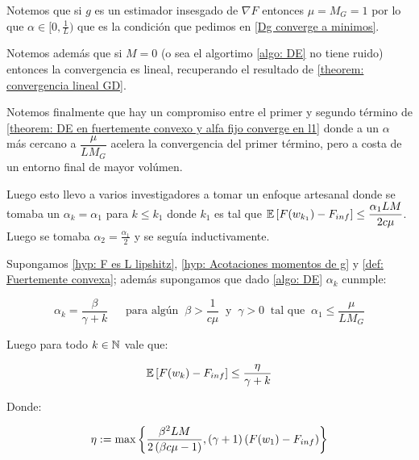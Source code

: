 \begin{remark}
	Notemos que si $g$ es un estimador insesgado de $\nabla F$ entonces $\mu = M_G = 1$ por lo que $\alpha \in [0, \frac{1}{L})$ que es la condici\'on que pedimos en \ref{Dg converge a minimos}.
\end{remark}

\begin{remark}
	Notemos adem\'as que si $M=0$ (o sea el algortimo \ref{algo: DE} no tiene ruido) entonces la convergencia es lineal, recuperando el resultado de \ref{theorem: convergencia lineal GD}.
\end{remark}

\begin{remark}
	Notemos finalmente que hay un compromiso entre el primer y segundo t\'ermino de \ref{theorem: DE en fuertemente convexo y alfa fijo converge en l1} donde a un $\alpha$ m\'as cercano a $\dfrac{\mu}{LM_G}$ acelera la convergencia del primer t\'ermino, pero a costa de un entorno final de mayor vol\'umen. 
	
	Luego esto llevo a varios investigadores a tomar un enfoque artesanal donde se tomaba un $\alpha_k = \alpha_1$ para $k \leq k_1$ donde $k_1$ es tal que $\mathbb{E} \left[F(w_{k_1}) - F_{inf}\right] \leq \dfrac{\alpha_1 LM}{2c \mu}$. Luego se tomaba $\alpha_2 = \frac{\alpha_1}{2}$ y se segu\'ia inductivamente.
\end{remark}

\begin{theorem}
	\label{theorem: DE en fuertemente convexo y alfa decreciente converge en l1}
	Supongamos \ref{hyp: F es L lipshitz}, \ref{hyp: Acotaciones momentos de g} y \ref{def: Fuertemente convexa}; adem\'as supongamos que dado \ref{algo: DE} $\alpha_k$ cunmple:
	
	\begin{equation}
	\label{eq: Condicion alfa Conv L1 fuertemente convexo decreciente}
	\alpha_k =  \dfrac{\beta}{\gamma + k} \quad \ \text{ para alg\'un } \ \beta > \frac{1}{c \mu} \  \text{ y } \ \gamma > 0 \  \text{ tal que } \ \alpha_1 \leq \dfrac{\mu}{L M_G} 
	\end{equation}
	
	Luego para todo $k \in {\mathbb{N}}$ vale que:
	
	\begin{equation*}
		\mathbb{E} \left[F(w_k) - F_{inf}\right] \leq \dfrac{\eta}{\gamma + k}
	\end{equation*}
	
	Donde:
	
	\begin{equation*}
		\eta := \max \left\lbrace\dfrac{\beta ^2 LM}{2 \left(\beta c \mu -1 \right)}, (\gamma + 1)\left(F(w_1) - F_{inf}\right)\right\rbrace
	\end{equation*}
	
\end{theorem}


